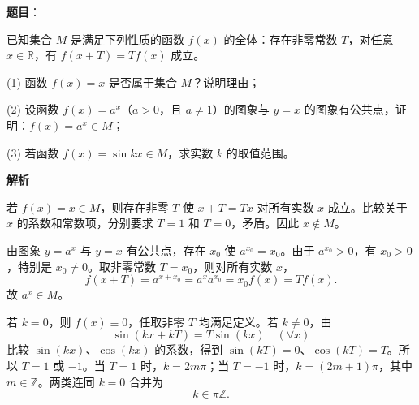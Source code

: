 \begin{answer}

\textbf{题目}：

已知集合 \(M\) 是满足下列性质的函数 \(f(x)\) 的全体：存在非零常数 \(T\)，对任意 \(x\in\mathbb{R}\)，有 \(f(x+T)=Tf(x)\) 成立。

    (1) 函数 \(f(x)=x\) 是否属于集合 \(M\)？说明理由；

    (2) 设函数 \(f(x)=a^x\)（\(a>0\)，且 \(a\ne1\)）的图象与 \(y=x\) 的图象有公共点，证明：\(f(x)=a^x\in M\)；

    (3) 若函数 \(f(x)=\sin kx\in M\)，求实数 \(k\) 的取值范围。

\textbf{解析}


若 \(f(x)=x\in M\)，则存在非零 \(T\) 使 \(x+T=Tx\) 对所有实数 \(x\) 成立。比较关于 \(x\) 的系数和常数项，分别要求 \(T=1\) 和 \(T=0\)，矛盾。因此 \(x\notin M\)。


由图象 \(y=a^x\) 与 \(y=x\) 有公共点，存在 \(x_0\) 使 \(a^{x_0}=x_0\)。由于 \(a^{x_0}>0\)，有 \(x_0>0\)，特别是 \(x_0\ne0\)。取非零常数 \(T=x_0\)，则对所有实数 \(x\)，
\nopagebreak[4]
\[
f(x+T)=a^{x+x_0}=a^x a^{x_0}=x_0 f(x)=Tf(x).
\]
故 \(a^x\in M\)。


若 \(k=0\)，则 \(f(x)\equiv0\)，任取非零 \(T\) 均满足定义。若 \(k\ne0\)，由
\nopagebreak[4]
\[
\sin(kx+kT)=T\sin(kx)\quad(\forall x)
\]
比较 \(\sin(kx)\)、\(\cos(kx)\) 的系数，得到 \(\sin(kT)=0\)、\(\cos(kT)=T\)。所以 \(T=1\) 或 \(-1\)。当 \(T=1\) 时，\(k=2m\pi\)；当 \(T=-1\) 时，\(k=(2m+1)\pi\)，其中 \(m\in\mathbb Z\)。两类连同 \(k=0\) 合并为
\nopagebreak[4]
\[
k\in\pi\mathbb Z.
\]




\end{answer}